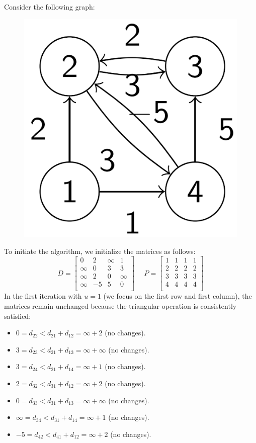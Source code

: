 \documentclass[12pt, a4paper]{report}
\begin{document}
    \begin{example}
        Consider the following graph:
        \begin{figure}[H]
            \centering
            \includegraphics[width=0.2\linewidth]{images/floyd.png}
        \end{figure}
        To initiate the algorithm, we initialize the matrices as follows:
        \[D=\begin{bmatrix}
            0 & 2 & \infty & 1 \\
            \infty & 0 & 3 & 3 \\
            \infty & 2 & 0 & \infty \\
            \infty & -5 & 5 & 0 \\
        \end{bmatrix}
        \:\:\:\:\:\:
        P=\begin{bmatrix}
            1 & 1 & 1 & 1 \\
            2 & 2 & 2 & 2 \\
            3 & 3 & 3 & 3 \\
            4 & 4 & 4 & 4 \\
        \end{bmatrix}
        \]
        In the first iteration with $u=1$ (we focus on the first row and first column), the matrices remain unchanged because the triangular operation is consistently satisfied:
        \begin{itemize}
            \item $0=d_{22} < d_{21} + d_{12} = \infty + 2$ (no changes). 
            \item $3=d_{23} < d_{21} + d_{13} = \infty + \infty$ (no changes). 
            \item $3=d_{24} < d_{21} + d_{14} = \infty + 1$ (no changes). 
            \item $2=d_{32} < d_{31} + d_{12} = \infty + 2$ (no changes). 
            \item $0=d_{33} < d_{31} + d_{13} = \infty + \infty$ (no changes). 
            \item $\infty=d_{34} < d_{31} + d_{14} = \infty + 1$ (no changes). 
            \item $-5=d_{42} < d_{41} + d_{12} = \infty + 2$ (no changes). 

\end{itemize}
\end{example}
\end{document}
